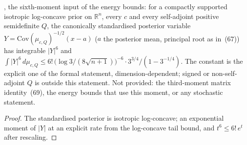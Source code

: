 \begin{lemma}
  \label{lem:bkl-posterior-sixth-moment}
  \leanok
  \cite{BizeulKlartagLehec2026}, the sixth-moment input of the energy bounds: for a compactly supported isotropic
  log-concave prior on $\mathbb R^n$, every $c$ and every self-adjoint positive semidefinite $Q$, the canonically
  standardised posterior variable $Y=\mathrm{Cov}(\mu_{c,Q})^{-1/2}(x-a)$ ($a$ the posterior mean, principal root as
  in~(67)) has integrable $|Y|^6$ and
  $\int|Y|^6\,d\mu_{c,Q}\le 6!\,\big(\log 3/(8\sqrt{n+1})\big)^{-6}\cdot 3^{3/4}/(1-3^{-1/4})$.  The constant is the
  explicit one of the formal statement, dimension-dependent; signed or non-self-adjoint $Q$ is outside this statement.
  Not provided: the third-moment matrix identity~(69), the energy bounds that use this moment, or any stochastic statement.
\end{lemma}
\begin{proof}
  \leanok
  The standardised posterior is isotropic log-concave; an exponential moment of $|Y|$ at an explicit rate from the
  log-concave tail bound, and $t^6\le 6!\,e^{t}$ after rescaling.
\end{proof}

